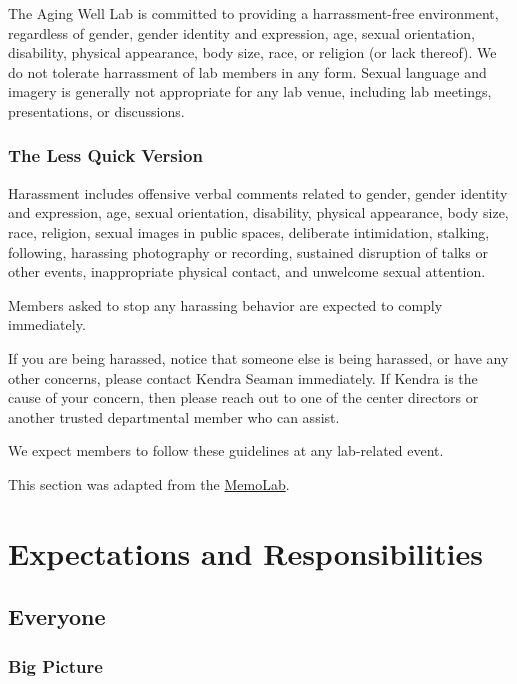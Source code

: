 \documentclass[]{book}
\begin{document}
The Aging Well Lab is committed to providing a harrassment-free environment, regardless of gender, gender identity and expression, age, sexual orientation, disability, physical appearance, body size, race, or religion (or lack thereof). We do not tolerate harrassment of lab members in any form. Sexual language and imagery is generally not appropriate for any lab venue, including lab meetings, presentations, or discussions.

\hypertarget{the-less-quick-version}{%
\subsection{The Less Quick Version}\label{the-less-quick-version}}

Harassment includes offensive verbal comments related to gender, gender identity and expression, age, sexual orientation, disability, physical appearance, body size, race, religion, sexual images in public spaces, deliberate intimidation, stalking, following, harassing photography or recording, sustained disruption of talks or other events, inappropriate physical contact, and unwelcome sexual attention.

Members asked to stop any harassing behavior are expected to comply immediately.

If you are being harassed, notice that someone else is being harassed, or have any other concerns, please contact Kendra Seaman immediately. If Kendra is the cause of your concern, then please reach out to one of the center directors or another trusted departmental member who can assist.

We expect members to follow these guidelines at any lab-related event.

This section was adapted from the \href{https://github.com/memobc/memolab-manual\#code-of-conduct}{MemoLab}.

\hypertarget{expectations-and-responsibilities}{%
\chapter{Expectations and Responsibilities}\label{expectations-and-responsibilities}}

\hypertarget{everyone}{%
\section{Everyone}\label{everyone}}

\hypertarget{big-picture}{%
\subsection{Big Picture}\label{big-picture}}
\end{document}
